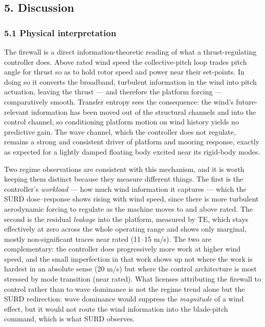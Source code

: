 \documentclass[
  english,
  11pt,
]{article}
\begin{document}
\subsection{5. Discussion}\label{discussion}

\subsubsection{5.1 Physical
interpretation}\label{physical-interpretation}

The firewall is a direct information-theoretic reading of what a
thrust-regulating controller does. Above rated wind speed the
collective-pitch loop trades pitch angle for thrust so as to hold rotor
speed and power near their set-points. In doing so it converts the
broadband, turbulent information in the wind into pitch actuation,
leaving the thrust --- and therefore the platform forcing ---
comparatively smooth. Transfer entropy sees the consequence: the wind's
future-relevant information has been moved out of the structural
channels and into the control channel, so conditioning platform motion
on wind history yields no predictive gain. The wave channel, which the
controller does not regulate, remains a strong and consistent driver of
platform and mooring response, exactly as expected for a lightly damped
floating body excited near its rigid-body modes.

Two regime observations are consistent with this mechanism, and it is
worth keeping them distinct because they measure different things. The
first is the controller's \emph{workload} --- how much wind information
it captures --- which the SURD dose--response shows rising with wind
speed, since there is more turbulent aerodynamic forcing to regulate as
the machine moves to and above rated. The second is the residual
\emph{leakage} into the platform, measured by TE, which stays
effectively at zero across the whole operating range and shows only
marginal, mostly non-significant traces near rated (11--15 m/s). The two
are complementary: the controller does progressively more work at higher
wind speed, and the small imperfection in that work shows up not where
the work is hardest in an absolute sense (20 m/s) but where the control
architecture is most stressed by mode transition (near rated). What
licenses attributing the firewall to control rather than to wave
dominance is not the regime trend alone but the SURD redirection: wave
dominance would suppress the \emph{magnitude} of a wind effect, but it
would not route the wind information into the blade-pitch command, which
is what SURD observes.
\end{document}
